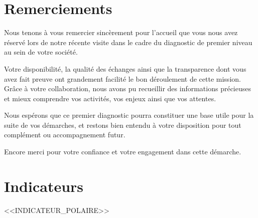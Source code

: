 \documentclass[11pt,a4paper]{article}
\begin{document}
	
	{
		\hypersetup{linkcolor=esieadarkblue}
		{\setlength{\parskip}{0pt}\tableofcontents}
	}
	\thispagestyle{fancy}
	\clearpage
	
	
	\section*{Remerciements}
	
	\begin{tcolorbox}[
		colback=lightgray,
		colframe=esieadarkblue,
		arc=4pt,
		boxrule=0.8pt,
		left=10pt, right=10pt, top=8pt, bottom=8pt
		]
		Nous tenons à vous remercier sincèrement pour l'accueil que vous nous avez réservé lors de notre récente visite dans le cadre du diagnostic de premier niveau au sein de votre société.
		
		Votre disponibilité, la qualité des échanges ainsi que la transparence dont vous avez fait preuve ont grandement facilité le bon déroulement de cette mission. Grâce à votre collaboration, nous avons pu recueillir des informations précieuses et mieux comprendre vos activités, vos enjeux ainsi que vos attentes.
		
		Nous espérons que ce premier diagnostic pourra constituer une base utile pour la suite de vos démarches, et restons bien entendu à votre disposition pour tout complément ou accompagnement futur.
		
		Encore merci pour votre confiance et votre engagement dans cette démarche.
	\end{tcolorbox}
	
	\clearpage
	
	\section*{Indicateurs}
	
	<<INDICATEUR_POLAIRE>>
	
	\clearpage
	
\end{document}
